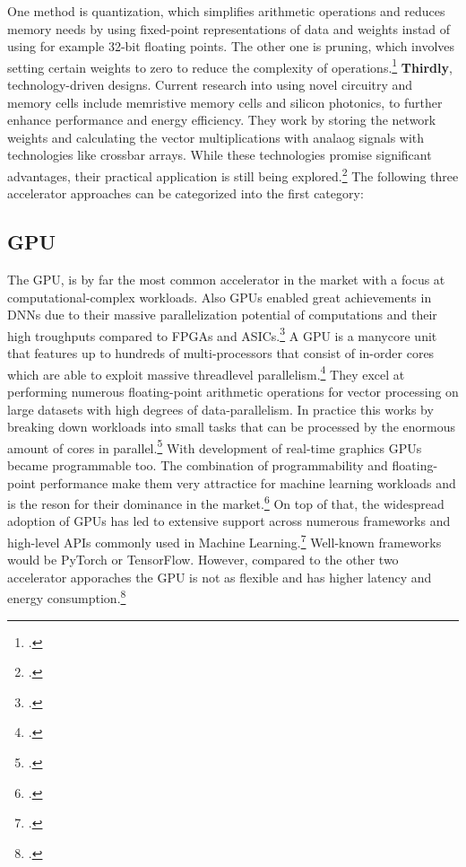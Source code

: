 One method is quantization, which simplifies arithmetic operations and reduces memory needs by using fixed-point representations of data and weights instad of using for example 32-bit floating points.
The other one is pruning, which involves setting certain weights to zero to reduce the complexity of operations.\footcite[cf.][3883]{lehnertMostResourceEfficient2023}
\textbf{Thirdly}, technology-driven designs.
Current research into using novel circuitry and memory cells include memristive memory cells and silicon photonics, to further enhance performance and energy efficiency.
They work by storing the network weights and calculating the vector multiplications with analaog signals with technologies like crossbar arrays.
While these technologies promise significant advantages, their practical application is still being explored.\footcite[cf.][3883]{lehnertMostResourceEfficient2023}
The following three accelerator approaches can be categorized into the first category:

\subsection{GPU}
The \ac{GPU}, is by far the most common accelerator in the market with a focus at computational-complex workloads.
Also \ac{GPU}s enabled great achievements in \ac{DNN}s due to their massive parallelization potential of computations and their high troughputs compared to \ac{FPGA}s and \ac{ASIC}s.\footcite[cf.][16]{baischerLearningHardwareTutorial2021}
A \ac{GPU} is a manycore unit that features up to hundreds of multi-processors that consist of in-order cores which are able to exploit massive threadlevel parallelism.\footcite[cf.][2]{peccerilloSurveyHardwareAccelerators2022}
They excel at performing numerous floating-point arithmetic operations for vector processing on large datasets with high degrees of data-parallelism.
In practice this works by breaking down workloads into small tasks that can be processed by the enormous amount of cores in parallel.\footcite[cf.][101]{huSurveyConvolutionalNeural2022} 
With development of real-time graphics \ac{GPU}s became programmable too. The combination of programmability and floating-point performance
make them very attractice for machine learning workloads and is the reson for their dominance in the market.\footcite[cf.][42]{dallyEvolutionGraphicsProcessing2021}
On top of that, the widespread adoption of \ac{GPU}s has led to extensive support across numerous frameworks and high-level APIs commonly used in Machine Learning.\footcite[cf.][16]{baischerLearningHardwareTutorial2021}
Well-known frameworks would be PyTorch or TensorFlow.
However, compared to the other two accelerator apporaches the \ac{GPU} is not as flexible and has higher latency and energy consumption.\footcite[cf.][100]{huSurveyConvolutionalNeural2022}

